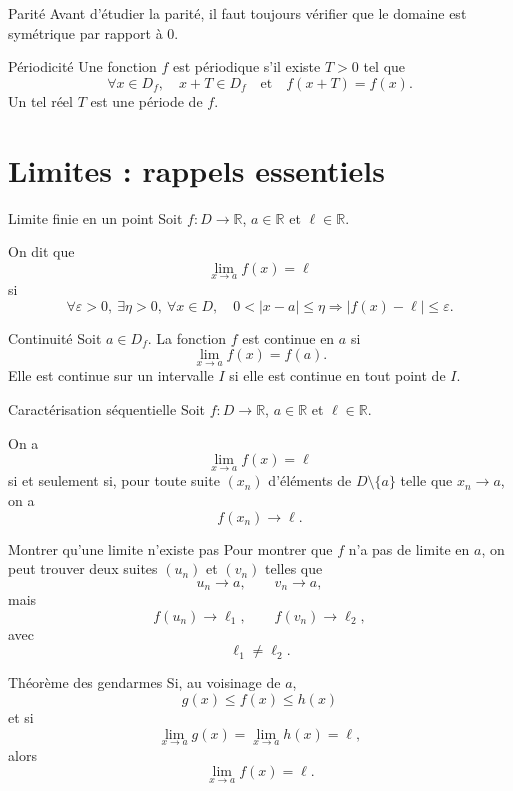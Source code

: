 \documentclass[11pt,a4paper]{article}
\newcommand{\R}{\mathbb{R}}
\begin{document}
\begin{warningbox}{Parité}
Avant d'étudier la parité, il faut toujours vérifier que le domaine est symétrique par rapport à $0$.
\end{warningbox}

\begin{definitionbox}{Périodicité}
Une fonction $f$ est périodique s'il existe $T>0$ tel que
\[
\forall x\in D_f,\quad x+T\in D_f
\quad\text{et}\quad
f(x+T)=f(x).
\]
Un tel réel $T$ est une période de $f$.
\end{definitionbox}

\section{Limites : rappels essentiels}

\begin{definitionbox}{Limite finie en un point}
Soit $f : D\to\R$, $a\in\R$ et $\ell\in\R$.

On dit que
\[
\lim_{x\to a} f(x)=\ell
\]
si
\[
\forall \varepsilon>0,\ \exists \eta>0,\ \forall x\in D,\quad
0<|x-a|\leq \eta \Longrightarrow |f(x)-\ell|\leq \varepsilon.
\]
\end{definitionbox}

\begin{definitionbox}{Continuité}
Soit $a\in D_f$. La fonction $f$ est continue en $a$ si
\[
\lim_{x\to a} f(x)=f(a).
\]
Elle est continue sur un intervalle $I$ si elle est continue en tout point de $I$.
\end{definitionbox}

\begin{theorembox}{Caractérisation séquentielle}
Soit $f:D\to\R$, $a\in\R$ et $\ell\in\R$.

On a
\[
\lim_{x\to a} f(x)=\ell
\]
si et seulement si, pour toute suite $(x_n)$ d'éléments de $D\setminus\{a\}$ telle que $x_n\to a$, on a
\[
f(x_n)\to \ell.
\]
\end{theorembox}

\begin{methodbox}{Montrer qu'une limite n'existe pas}
Pour montrer que $f$ n'a pas de limite en $a$, on peut trouver deux suites $(u_n)$ et $(v_n)$ telles que
\[
u_n\to a,\qquad v_n\to a,
\]
mais
\[
f(u_n)\to \ell_1,\qquad f(v_n)\to \ell_2,
\]
avec
\[
\ell_1\neq \ell_2.
\]
\end{methodbox}

\begin{theorembox}{Théorème des gendarmes}
Si, au voisinage de $a$,
\[
g(x)\leq f(x)\leq h(x)
\]
et si
\[
\lim_{x\to a}g(x)=\lim_{x\to a}h(x)=\ell,
\]
alors
\[
\lim_{x\to a}f(x)=\ell.
\]
\end{theorembox}
\end{document}
